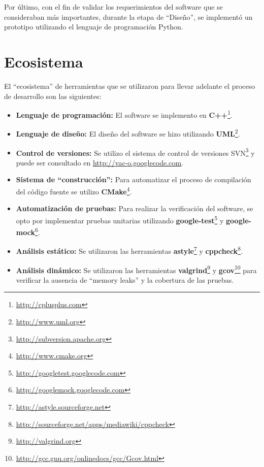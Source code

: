 Por \'ultimo, con el fin de validar los requerimientos del software que se
consideraban m\'as importantes, durante la etapa de ``Dise\~no'', se
implement\'o un prototipo utilizando el lenguaje de programaci\'on Python.

\section{Ecosistema}

El ``ecosistema'' de herramientas que se utilizaron para llevar adelante el
proceso de desarrollo son las siguientes:

\begin{itemize}
 \item \textbf{Lenguaje de programaci\'on:} El software se implemento en
\textbf{C++}\footnote{\url{http://cplusplus.com}}.
 \item \textbf{Lenguaje de dise\~no:} El dise\~no del software se hizo
utilizando \textbf{UML}\footnote{\url{http://www.uml.org}}.
 \item \textbf{Control de versiones:} Se utilizo el sistema de control de
versiones \ac{SVN}\footnote{\url{http://subversion.apache.org}} y puede ser
consultado en \url{http://vac-o.googlecode.com}.
 \item \textbf{Sistema de ``construcci\'on'':} Para automatizar el
proceso de compilaci\'on del c\'odigo fuente se
utilizo \textbf{CMake}\footnote{\url{http://www.cmake.org}}.
 \item \textbf{Automatizaci\'on de pruebas:} Para realizar la verificaci\'on del
software, se opto por implementar pruebas
unitarias utilizando
\textbf{google-test}\footnote{\url{http://googletest.googlecode.com}} y
\textbf{google-mock}\footnote{\url{http://googlemock.googlecode.com}}. 
 \item \textbf{An\'alisis est\'atico:} Se utilizaron las herramientas
\textbf{astyle}\footnote{\url{http://astyle.sourceforge.net}} y
\textbf{cppcheck}\footnote{
\url{http://sourceforge.net/apps/mediawiki/cppcheck}}.
 \item \textbf{An\'alisis din\'amico:} Se utilizaron las herramientas
\textbf{valgrind}\footnote{\url{http://valgrind.org}} y
\textbf{gcov}\footnote{\url{http://gcc.gnu.org/onlinedocs/gcc/Gcov.html}} para
verificar la ausencia de ``memory leaks'' y la cobertura de las pruebas.
\end{itemize}
